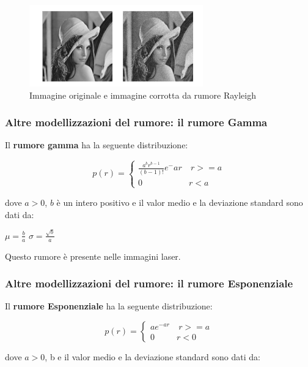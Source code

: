 \begin{figure}[H]
    \centering
    \includegraphics[width=\linewidth, keepaspectratio]{capitoli/immagini/imgs/esempio-rumore.png}
    \caption*{Immagine originale e immagine corrotta da rumore Rayleigh}
\end{figure}

\subsubsection{Altre modellizzazioni del rumore: il rumore Gamma}

Il \textbf{rumore gamma} ha la seguente distribuzione:

\begin{center}
    $$
        p(r) = \left\{ \begin{array}{cl}
            \frac{a^b r^{b-1}}{(b-1)!}e^-{ar} & \ r >= a \\
            0                                 & r<a
        \end{array} \right.
    $$
\end{center}

dove $a > 0$, $b$ è un intero positivo e il valor medio e la deviazione standard sono dati da:

\begin{center}
    $\mu=\frac{b}{a}$ $\sigma=\frac{\sqrt{b}}{a}$
\end{center}

Questo rumore è presente nelle immagini laser.

\subsubsection{Altre modellizzazioni del rumore: il rumore Esponenziale}

Il \textbf{rumore Esponenziale} ha la seguente distribuzione:

\begin{center}
    $$
        p(r) = \left\{ \begin{array}{cl}
            ae^{-ar} & \ r >= a \\
            0        & r<0
        \end{array} \right.
    $$
\end{center}
dove $a > 0$, b e il valor medio e la deviazione standard sono dati da:

